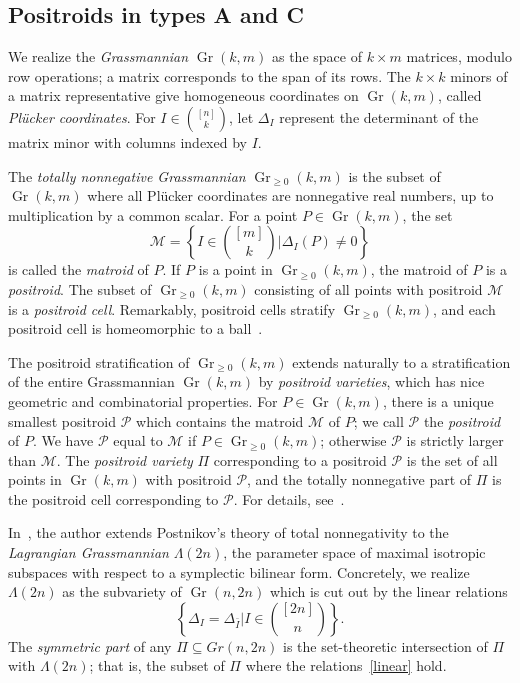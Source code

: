 \documentclass[10pt]{amsart}
\theoremstyle{definition}
\DeclareMathOperator{\Gr}{Gr}
\newcommand{\Lm}{\Lambda}
\begin{document}
\subsection{Positroids in types A and C}

We realize the \emph{Grassmannian} $\Gr(k,m)$ as the space of $k \times m$ matrices, modulo row operations; a matrix corresponds to the span of its rows. The $k \times k$ minors of a matrix representative give homogeneous coordinates on $\Gr(k,m)$, called \emph{Pl{\"u}cker coordinates}. For $I \in \binom{[n]}{k}$, let $\Delta_I$ represent the determinant of the matrix minor with columns indexed by $I$.

The \emph{totally nonnegative Grassmannian} $\Gr_{\geq 0}(k,m)$ is the subset of $\Gr(k,m)$ where all Pl{\"u}cker coordinates are nonnegative real numbers, up to multiplication by a common scalar. For a point $P \in \Gr(k,m)$, the set 
\[
\mathcal{M} = \left\{I \in \binom{[m]}{k} \mathrel{\Bigg|} \Delta_I(P) \neq 0\right\}
\]
is called the \emph{matroid} of $P$. If $P$ is a point in $\Gr_{\geq 0}(k,m)$, the matroid of $P$ is a \emph{positroid}. The subset of $\Gr_{\geq 0}(k,m)$ consisting of all points with positroid $\mathcal{M}$ is a \emph{positroid cell}. Remarkably, positroid cells stratify $\Gr_{\geq 0}(k,m)$, and each positroid cell is homeomorphic to a ball~\cite{Pos06}. 

The positroid stratification of $\Gr_{\geq 0}(k,m)$ extends naturally to a stratification of the entire Grassmannian $\Gr(k,m)$ by \emph{positroid varieties}, which has nice geometric and combinatorial properties. For $P \in \Gr(k,m)$, there is a unique smallest positroid $\mathscr{P}$ which contains the matroid $\mathcal{M}$ of $P$; we call $\mathscr{P}$ the \emph{positroid} of $P$. We have $\mathscr{P}$ equal to $\mathcal{M}$ if $P \in \Gr_{\geq 0}(k,m)$; otherwise $\mathscr{P}$ is strictly larger than $\mathcal{M}$. The \emph{positroid variety} $\Pi$ corresponding to a positroid $\mathscr{P}$ is the set of all points in $\Gr(k,m)$ with positroid $\mathscr{P}$, and the totally nonnegative part of $\Pi$ is the positroid cell corresponding to $\mathscr{P}$. For details, see~\cite{KLS13}.

In~\cite{Kar18}, the author extends Postnikov's theory of total nonnegativity to the \emph{Lagrangian Grassmannian} $\Lm(2n)$, the parameter space of maximal isotropic subspaces with respect to a symplectic bilinear form. Concretely, we realize $\Lm(2n)$ as the subvariety of $\Gr(n,2n)$ which is cut out by the linear relations
\begin{equation}
\label{linear} \left\{\Delta_I = \Delta_{\bar{I}} \mathrel{\Bigg|} I \in \binom{[2n]}{n} \right\}.\end{equation} 
The \emph{symmetric part} of any $\Pi \subseteq Gr(n,2n)$ is the set-theoretic intersection of $\Pi$ with $\Lm(2n)$; that is, the subset of $\Pi$ where the relations~\eqref{linear} hold. 
 
\end{document}
